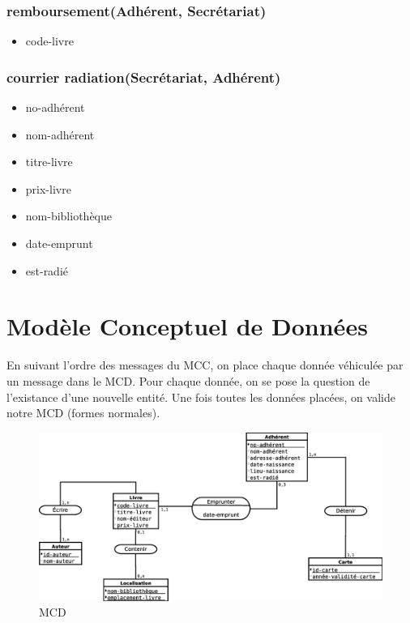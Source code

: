 \subsubsection*{remboursement(Adhérent, Secrétariat)}
\begin{itemize}
    \item code-livre
\end{itemize}

\subsubsection*{courrier radiation(Secrétariat, Adhérent)}
\begin{itemize}
    \item no-adhérent
    \item nom-adhérent
    \item titre-livre
    \item prix-livre
    \item nom-bibliothèque
    \item date-emprunt
    \item est-radié
\end{itemize}

\newpage
\section*{Modèle Conceptuel de Données}

En suivant l'ordre des messages du MCC, on place chaque donnée véhiculée par un message dans le MCD. Pour chaque donnée, on se pose la question de l'existance d'une nouvelle entité. Une fois toutes les données placées, on valide notre MCD (formes normales).

\begin{figure}[!htb]
    \begin{center}
    \includegraphics[width=11.5cm]{images/cc1_mcd.eps}
    \caption{\label{cc1_mcd} MCD}
    \end{center}
\end{figure}

